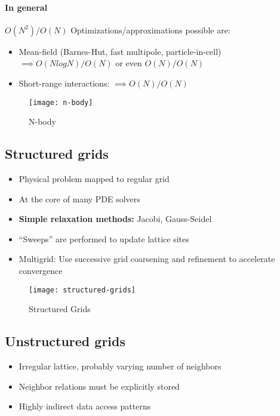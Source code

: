 \paragraph{In general} $ O(N^2)/O(N) $
Optimizations/approximations possible are: 
\begin{itemize}
    \item Mean-field (Barnes-Hut, fast multipole, particle-in-cell) $ \implies O(N log N)/O(N) $
    or even $ O(N)/O(N) $
    \item Short-range interactions: $ \implies O(N)/O(N) $
\end{itemize}

\begin{figure}[!htbp]
    \centering
    \texttt{[image: n-body]}
    \caption{N-body}
\end{figure}


\subsection{Structured grids}
\begin{itemize}
    \item Physical problem mapped to regular grid
    \item At the core of many PDE solvers
    \item \textbf{Simple relaxation methods:} Jacobi, Gauss-Seidel
    \item “Sweeps” are performed to update lattice sites
    \item Multigrid: Use successive grid coarsening and refinement to accelerate convergence
\end{itemize}

\begin{figure}[!htbp]
    \centering
    \texttt{[image: structured-grids]}
    \caption{Structured Grids}
\end{figure}

\subsection{Unstructured grids}
\begin{itemize}
    \item Irregular lattice, probably varying number of neighbors
    \item Neighbor relations must be explicitly stored
    \item Highly indirect data access patterns
\end{itemize}

